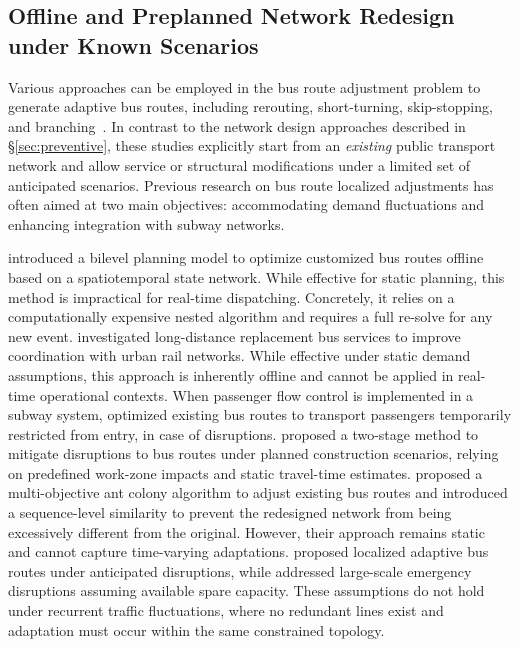 \documentclass[a4paper,fleqn]{cas-sc}
\begin{document}
\subsection{Offline and Preplanned Network Redesign under Known Scenarios}
\label{sec:offline}

Various approaches can be employed in the bus route adjustment problem to generate adaptive bus routes, including rerouting, short-turning, skip-stopping, and branching~\citep{cao2019autonomous, ma2023integrated, wu2021modular}. 
In contrast to the network design approaches described in \S{}\ref{sec:preventive}, these studies explicitly start from an \emph{existing} public transport network and allow service or structural modifications under a limited set of anticipated scenarios.
Previous research on bus route localized adjustments has often aimed at two main objectives: accommodating demand fluctuations and enhancing integration with subway networks.

\cite{guan2023bi} introduced a bilevel planning model to optimize customized bus routes offline based on a spatiotemporal state network. While effective for static planning, this method is impractical for real-time dispatching. Concretely, it relies on a computationally expensive nested algorithm and requires a full re-solve for any new event.
%
\cite{zhang2018optimal} investigated long-distance replacement bus services to improve coordination with urban rail networks. While effective under static demand assumptions, this approach is inherently offline and cannot be applied in real-time operational contexts.
%
When passenger flow control is implemented in a subway system, \cite{zhou2021integrated} optimized existing bus routes to transport passengers temporarily restricted from entry, in case of disruptions.
%
\cite{wang2022optimization} proposed a two-stage method to mitigate disruptions to bus routes under planned construction scenarios, relying on predefined work-zone impacts and static travel-time estimates.
%
\cite{wu2024multi} proposed a multi-objective ant colony algorithm to adjust existing bus routes and introduced a sequence-level similarity to prevent the redesigned network from being excessively different from the original. However, their approach remains static and cannot capture time-varying adaptations.
%
\cite{zheng2024alternative} proposed localized adaptive bus routes under anticipated disruptions, while \cite{zhang2024improving} addressed large-scale emergency disruptions assuming available spare capacity.
These assumptions do not hold under recurrent traffic fluctuations, where no redundant lines exist and adaptation must occur within the same constrained topology.
\end{document}
